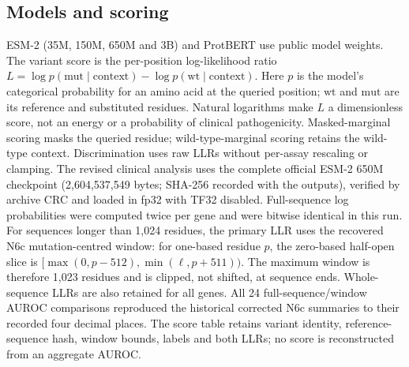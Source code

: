 \subsection{Models and scoring}
ESM-2 (35M, 150M, 650M and 3B) and ProtBERT use public model weights. The variant score is the per-position log-likelihood ratio
$L=\log p(\mathrm{mut}\mid\mathrm{context})-\log p(\mathrm{wt}\mid\mathrm{context})$.
Here $p$ is the model's categorical probability for an amino acid at the
queried position; $\mathrm{wt}$ and $\mathrm{mut}$ are its reference and
substituted residues. Natural logarithms make $L$ a dimensionless score,
not an energy or a probability of clinical pathogenicity.
Masked-marginal scoring masks the queried residue; wild-type-marginal scoring retains the wild-type context. Discrimination uses raw LLRs without per-assay rescaling or clamping. The revised clinical analysis uses the complete official ESM-2 650M checkpoint (2,604,537,549 bytes; SHA-256 recorded with the outputs), verified by archive CRC and loaded in fp32 with TF32 disabled. Full-sequence log probabilities were computed twice per gene and were bitwise identical in this run. For sequences longer than 1,024 residues, the primary LLR uses the recovered N6c mutation-centred window: for one-based residue $p$, the zero-based half-open slice is $[\max(0,p-512),\min(\ell,p+511))$. The maximum window is therefore 1,023 residues and is clipped, not shifted, at sequence ends. Whole-sequence LLRs are also retained for all genes. All 24 full-sequence/window AUROC comparisons reproduced the historical corrected N6c summaries to their recorded four decimal places. The score table retains variant identity, reference-sequence hash, window bounds, labels and both LLRs; no score is reconstructed from an aggregate AUROC.

